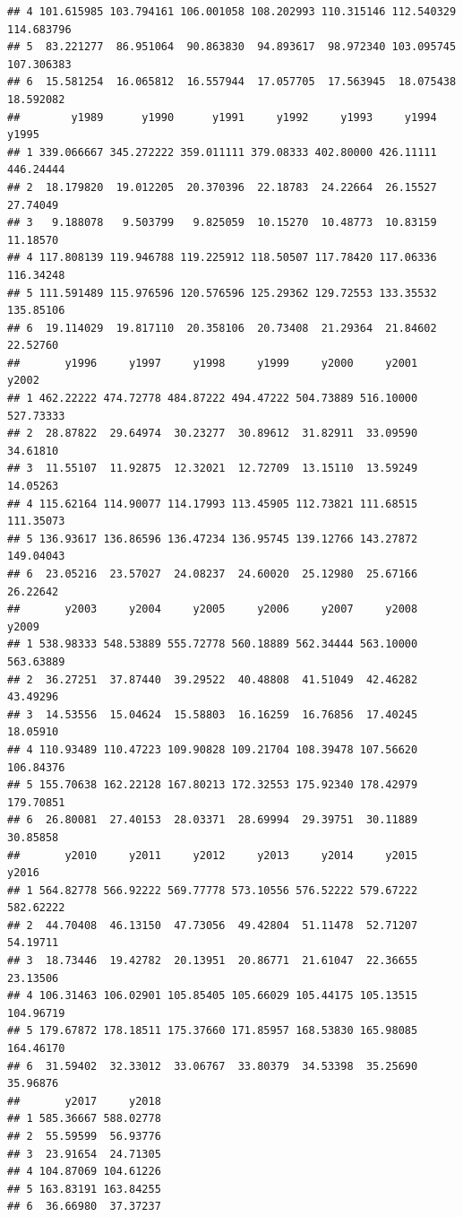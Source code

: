 \documentclass[
]{book}
\begin{document}
\begin{verbatim}
## 4 101.615985 103.794161 106.001058 108.202993 110.315146 112.540329 114.683796
## 5  83.221277  86.951064  90.863830  94.893617  98.972340 103.095745 107.306383
## 6  15.581254  16.065812  16.557944  17.057705  17.563945  18.075438  18.592082
##        y1989      y1990      y1991     y1992     y1993     y1994     y1995
## 1 339.066667 345.272222 359.011111 379.08333 402.80000 426.11111 446.24444
## 2  18.179820  19.012205  20.370396  22.18783  24.22664  26.15527  27.74049
## 3   9.188078   9.503799   9.825059  10.15270  10.48773  10.83159  11.18570
## 4 117.808139 119.946788 119.225912 118.50507 117.78420 117.06336 116.34248
## 5 111.591489 115.976596 120.576596 125.29362 129.72553 133.35532 135.85106
## 6  19.114029  19.817110  20.358106  20.73408  21.29364  21.84602  22.52760
##       y1996     y1997     y1998     y1999     y2000     y2001     y2002
## 1 462.22222 474.72778 484.87222 494.47222 504.73889 516.10000 527.73333
## 2  28.87822  29.64974  30.23277  30.89612  31.82911  33.09590  34.61810
## 3  11.55107  11.92875  12.32021  12.72709  13.15110  13.59249  14.05263
## 4 115.62164 114.90077 114.17993 113.45905 112.73821 111.68515 111.35073
## 5 136.93617 136.86596 136.47234 136.95745 139.12766 143.27872 149.04043
## 6  23.05216  23.57027  24.08237  24.60020  25.12980  25.67166  26.22642
##       y2003     y2004     y2005     y2006     y2007     y2008     y2009
## 1 538.98333 548.53889 555.72778 560.18889 562.34444 563.10000 563.63889
## 2  36.27251  37.87440  39.29522  40.48808  41.51049  42.46282  43.49296
## 3  14.53556  15.04624  15.58803  16.16259  16.76856  17.40245  18.05910
## 4 110.93489 110.47223 109.90828 109.21704 108.39478 107.56620 106.84376
## 5 155.70638 162.22128 167.80213 172.32553 175.92340 178.42979 179.70851
## 6  26.80081  27.40153  28.03371  28.69994  29.39751  30.11889  30.85858
##       y2010     y2011     y2012     y2013     y2014     y2015     y2016
## 1 564.82778 566.92222 569.77778 573.10556 576.52222 579.67222 582.62222
## 2  44.70408  46.13150  47.73056  49.42804  51.11478  52.71207  54.19711
## 3  18.73446  19.42782  20.13951  20.86771  21.61047  22.36655  23.13506
## 4 106.31463 106.02901 105.85405 105.66029 105.44175 105.13515 104.96719
## 5 179.67872 178.18511 175.37660 171.85957 168.53830 165.98085 164.46170
## 6  31.59402  32.33012  33.06767  33.80379  34.53398  35.25690  35.96876
##       y2017     y2018
## 1 585.36667 588.02778
## 2  55.59599  56.93776
## 3  23.91654  24.71305
## 4 104.87069 104.61226
## 5 163.83191 163.84255
## 6  36.66980  37.37237
\end{verbatim}
\end{document}
